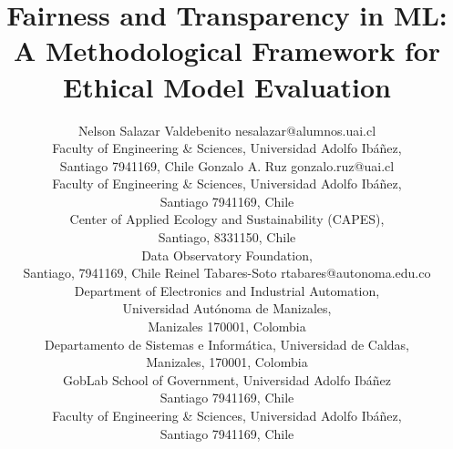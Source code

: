 \documentclass[twoside,11pt]{article}
\begin{document}
\title{Fairness and Transparency in ML: A Methodological Framework for Ethical Model Evaluation}

\author{\name Nelson Salazar Valdebenito \email nesalazar@alumnos.uai.cl \\
        \addr Faculty of Engineering \& Sciences, Universidad Adolfo Ibáñez,\\
        Santiago 7941169, Chile
        \AND 
       \name Gonzalo A. Ruz \email gonzalo.ruz@uai.cl \\
       \addr Faculty of Engineering \& Sciences, Universidad Adolfo Ibáñez,\\
        Santiago 7941169, Chile\\
        \addr Center of Applied Ecology and Sustainability (CAPES), \\ 
        Santiago, 8331150, Chile\\
        \addr Data Observatory Foundation,\\
        Santiago, 7941169, Chile
       \AND
       \name Reinel Tabares-Soto \email  rtabares@autonoma.edu.co \\
       \addr Department of Electronics and Industrial Automation,\\ Universidad Autónoma de Manizales,\\ Manizales 170001, Colombia\\
       \addr Departamento de Sistemas e Informática, Universidad de Caldas, \\
       Manizales, 170001, Colombia \\
       \addr GobLab School of Government, Universidad Adolfo Ibáñez\\
       Santiago 7941169, Chile\\
       \addr Faculty of Engineering \& Sciences, Universidad Adolfo Ibáñez,\\
        Santiago 7941169, Chile\\}
       


\maketitle
\end{document}
